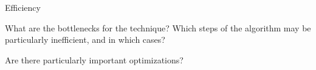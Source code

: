 \documentclass[a4paper]{article}
\begin{document}
\begin{minipage}[t]{0.16\linewidth}
\begin{betterlist}
\begin{betterlist}
		\end{betterlist}
		\item \alert{Efficiency}
		\begin{betterlist}
			\item What are the bottlenecks for the technique? Which steps of the algorithm may be particularly inefficient, and in which cases?

			\item Are there particularly important optimizations?


\end{betterlist}
\end{betterlist}
\end{minipage}
\end{document}
